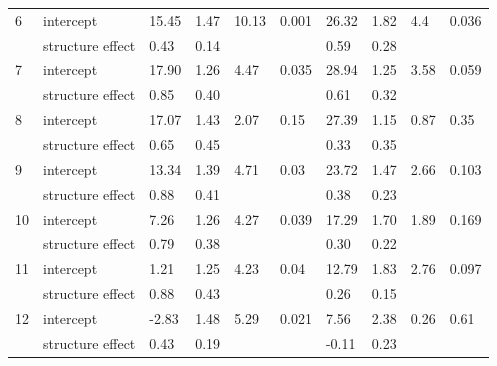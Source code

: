 \documentclass{article}
\begin{document}
\begin{table}[ht]
\begin{tabular}{|p{}|p{}|p{}p{}p{}p{}|p{}p{}p{}p{}|}
   \hline
  6 & intercept & 15.45 & 1.47 & 10.13 & 0.001 & 26.32 & 1.82 & 4.4 & 0.036 \\ 
   & structure effect & 0.43 & 0.14 &  &  & 0.59 & 0.28 &  &  \\ 
   \hline
  7 & intercept & 17.90 & 1.26 & 4.47 & 0.035 & 28.94 & 1.25 & 3.58 & 0.059 \\ 
   & structure effect & 0.85 & 0.40 &  &  & 0.61 & 0.32 &  &  \\ 
   \hline
  8 & intercept & 17.07 & 1.43 & 2.07 & 0.15 & 27.39 & 1.15 & 0.87 & 0.35 \\ 
   & structure effect & 0.65 & 0.45 &  &  & 0.33 & 0.35 &  &  \\ 
   \hline
  9 & intercept & 13.34 & 1.39 & 4.71 & 0.03 & 23.72 & 1.47 & 2.66 & 0.103 \\ 
   & structure effect & 0.88 & 0.41 &  &  & 0.38 & 0.23 &  &  \\ 
   \hline
 10 & intercept & 7.26 & 1.26 & 4.27 & 0.039 & 17.29 & 1.70 & 1.89 & 0.169 \\ 
   & structure effect & 0.79 & 0.38 &  &  & 0.30 & 0.22 &  &  \\ 
   \hline
 11 & intercept & 1.21 & 1.25 & 4.23 & 0.04 & 12.79 & 1.83 & 2.76 & 0.097 \\ 
   & structure effect & 0.88 & 0.43 &  &  & 0.26 & 0.15 &  &  \\ 
   \hline
 12 & intercept & -2.83 & 1.48 & 5.29 & 0.021 & 7.56 & 2.38 & 0.26 & 0.61 \\ 
   & structure effect & 0.43 & 0.19 &  &  & -0.11 & 0.23 &  &  \\ 
   \hline
\end{tabular}
\endgroup
\end{table}\clearpage
  
\end{document}
